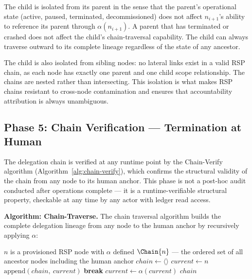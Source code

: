 The child is isolated from its parent in the sense that the parent's operational state (active, paused, terminated, decommissioned) does not affect $n_{i+1}$'s ability to reference its parent through $\alpha(n_{i+1})$. A parent that has terminated or crashed does not affect the child's chain-traversal capability. The child can always traverse outward to its complete lineage regardless of the state of any ancestor.

The child is also isolated from sibling nodes: no lateral links exist in a valid RSP chain, as each node has exactly one parent and one child scope relationship. The chains are nested rather than intersecting. This isolation is what makes RSP chains resistant to cross-node contamination and ensures that accountability attribution is always unambiguous.

\subsection{Phase 5: Chain Verification --- Termination at Human}
\label{sec:rs-phase5-chain-verification}

The delegation chain is verified at any runtime point by the Chain-Verify algorithm (Algorithm~\ref{alg:chain-verify}), which confirms the structural validity of the chain from any node to its human anchor. This phase is not a post-hoc audit conducted after operations complete --- it is a runtime-verifiable structural property, checkable at any time by any actor with ledger read access.

\medskip
\noindent\textbf{Algorithm: Chain-Traverse.} The chain traversal algorithm builds the complete delegation lineage from any node to the human anchor by recursively applying $\alpha$:

\begin{algorithm}
\caption{Chain-Traverse($n$) --- Build the delegation chain from node $n$ to the human anchor}
\label{alg:chain-traverse}
\begin{algorithmic}[1]
\REQUIRE $n$ is a provisioned RSP node with $\alpha$ defined
\ENSURE $\Chain{n}$ --- the ordered set of all ancestor nodes including the human anchor
\STATE $chain \leftarrow \langle \rangle$ 
\STATE $current \leftarrow n$ 
    \STATE $\text{append}(chain,\ current)$ 
        \STATE \textbf{break} 
    \ENDIF
    \STATE $current \leftarrow \alpha(current)$ 
\ENDWHILE
\RETURN $chain$
\end{algorithmic}
\end{algorithm}

